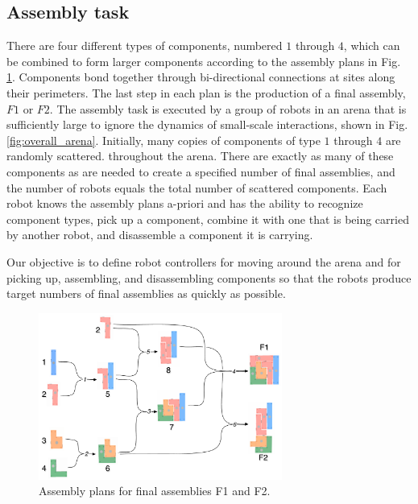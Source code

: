 \subsection{Assembly task} %
\label{sub:assembly_task}

There are four different types of components, numbered $1$ through
$4$, which can be combined to form larger components according to
the assembly plans in Fig. \ref{fig:assembly_plans}.  Components
bond together through bi-directional connections at sites along
their perimeters. The last step in each plan is the production of a
final assembly, $F1$ or $F2$.  The assembly task is executed by a
group of robots in an arena that is sufficiently large to ignore the
dynamics of small-scale interactions, shown in Fig.
\ref{fig:overall_arena}. Initially, many copies of components of
type $1$ through $4$ are randomly scattered. throughout the arena.
There are exactly as many of these components as are needed to
create a specified number of final assemblies, and the number of
robots equals the total number of scattered components. Each robot
knows the assembly plans a-priori and has the ability to recognize
component types, pick up a component, combine it with one that is
being carried by another robot, and disassemble a component it is
carrying.

Our objective is to define robot controllers for moving around the
arena and for picking up, assembling, and disassembling components
so that the robots produce target numbers of final assemblies as
quickly as possible.


    \begin{figure}[h!]
        \centering
            \includegraphics[width=8cm]{img/assembly_plans.pdf}
        \caption{Assembly plans for final assemblies F1 and F2.}
        \label{fig:assembly_plans}
    \end{figure}


